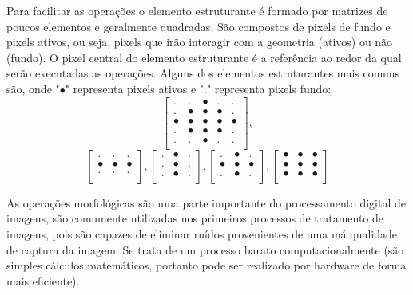 \documentclass[conference,harvard,brazil,english]{sbatex}
\begin{document}
Para facilitar as operações o elemento estruturante é formado por matrizes de poucos elementos e geralmente quadradas. São compostos de pixels de fundo e pixels ativos, ou seja, pixels que irão interagir com a geometria (ativos) ou não (fundo). O pixel central do elemento estruturante é a referência ao redor da qual serão executadas as operações. 
Alguns dos elementos estruturantes mais comuns são, onde "\(\bullet\)" representa pixels ativos e "." representa pixels fundo:
\[
\begin{bmatrix}
    . & . & \bullet & . & . \\
    . & \bullet & \bullet & \bullet & . \\
    \bullet & \bullet & \bullet & \bullet & \bullet \\
    . & \bullet & \bullet & \bullet & . \\
    . & . & \bullet & . & . \\
\end{bmatrix},
\]
\[
\begin{bmatrix}
    . & . & . \\
    \bullet & \bullet & \bullet \\
    . & . & . \\
\end{bmatrix}, 
\begin{bmatrix}
    . & \bullet & . \\
    . & \bullet & . \\
    . & \bullet & . \\
\end{bmatrix}, 
\begin{bmatrix}
    . & \bullet & . \\
    \bullet & \bullet & \bullet \\
    . & \bullet & . \\
\end{bmatrix}, 
\begin{bmatrix}
    \bullet & \bullet & \bullet \\
    \bullet & \bullet & \bullet \\
    \bullet & \bullet & \bullet \\
\end{bmatrix}
\]

As operações morfológicas são uma parte importante do processamento digital de imagens, são comumente utilizadas nos primeiros processos de tratamento de imagens, pois são capazes de eliminar ruídos provenientes de uma má qualidade de captura da imagem. Se trata de um processo barato computacionalmente (são simples cálculos matemáticos, portanto pode ser realizado por hardware de forma mais eficiente).
\end{document}
